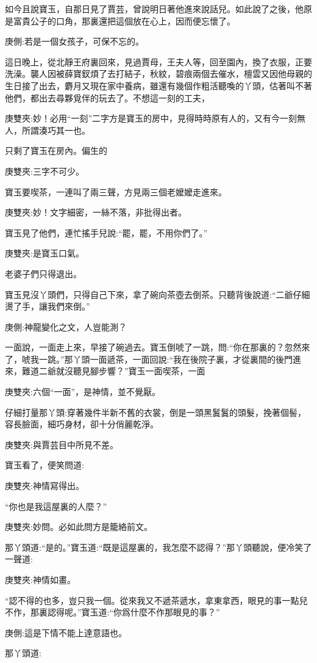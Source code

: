 \begin{parag}
    如今且說寶玉，自那日見了賈芸，曾說明日著他進來說話兒。如此說了之後，他原是富貴公子的口角，那裏還把這個放在心上，因而便忘懷了。\begin{note}庚側:若是一個女孩子，可保不忘的。\end{note}這日晚上，從北靜王府裏回來，見過賈母，王夫人等，回至園內，換了衣服，正要洗澡。襲人因被薛寶釵煩了去打結子，秋紋，碧痕兩個去催水，檀雲又因他母親的生日接了出去，麝月又現在家中養病，雖還有幾個作粗活聽喚的丫頭，估著叫不著他們，都出去尋夥覓伴的玩去了。不想這一刻的工夫，\begin{note}庚雙夾:妙！必用“一刻”二字方是寶玉的房中，見得時時原有人的，又有今一刻無人，所謂湊巧其一也。\end{note}只剩了寶玉在房內。偏生的\begin{note}庚雙夾:三字不可少。\end{note}寶玉要喫茶，一連叫了兩三聲，方見兩三個老嬤嬤走進來。\begin{note}庚雙夾:妙！文字細密，一絲不落，非批得出者。\end{note}寶玉見了他們，連忙搖手兒說:“罷，罷，不用你們了。”\begin{note}庚雙夾:是寶玉口氣。\end{note}老婆子們只得退出。
\end{parag}


\begin{parag}
    寶玉見沒丫頭們，只得自己下來，拿了碗向茶壺去倒茶。只聽背後說道:“二爺仔細燙了手，讓我們來倒。”\begin{note}庚側:神龍變化之文，人豈能測？\end{note}一面說，一面走上來，早接了碗過去。寶玉倒唬了一跳，問:“你在那裏的？忽然來了，唬我一跳。”那丫頭一面遞茶，一面回說:“我在後院子裏，才從裏間的後門進來，難道二爺就沒聽見腳步響？”寶玉一面喫茶，一面\begin{note}庚雙夾:六個“一面”，是神情，並不覺厭。\end{note}仔細打量那丫頭:穿著幾件半新不舊的衣裳，倒是一頭黑鬒鬒的頭髮，挽著個髻，容長臉面，細巧身材，卻十分俏麗乾淨。\begin{note}庚雙夾:與賈芸目中所見不差。\end{note}寶玉看了，便笑問道:\begin{note}庚雙夾:神情寫得出。\end{note}“你也是我這屋裏的人麼？”\begin{note}庚雙夾:妙問。必如此問方是籠絡前文。\end{note}那丫頭道:“是的。”寶玉道:“既是這屋裏的，我怎麼不認得？”那丫頭聽說，便冷笑了一聲道:\begin{note}庚雙夾:神情如畫。\end{note}“認不得的也多，豈只我一個。從來我又不遞茶遞水，拿東拿西，眼見的事一點兒不作，那裏認得呢。”寶玉道:“你爲什麼不作那眼見的事？”\begin{note}庚側:這是下情不能上達意語也。\end{note}那丫頭道:
\end{parag}


